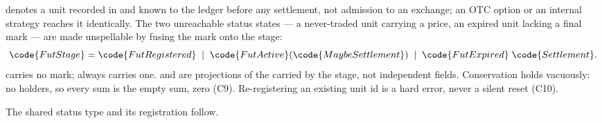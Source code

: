 \documentclass[11pt,a4paper]{article}
\begin{document}
 denotes a unit recorded in and known to the ledger before any settlement, not
admission to an exchange; an OTC option or an internal strategy reaches it identically. The two
unreachable status states --- a never-traded unit carrying a price, an expired unit lacking a final
mark --- are made unspellable by fusing the mark onto the stage:
\[
\code{FutStage}=\code{FutRegistered}\;\mid\;\code{FutActive}(\code{Maybe Settlement})\;\mid\;
\code{FutExpired}\;\code{Settlement}.
\]
 carries no mark;  always carries one. 
and  are projections of the  carried by the stage, not
independent fields. Conservation holds vacuously: no holders, so every sum is the empty sum, zero
(C9). Re-registering an existing unit id is a hard error, never a silent reset (C10).

The shared status type and its registration follow.
\end{document}
